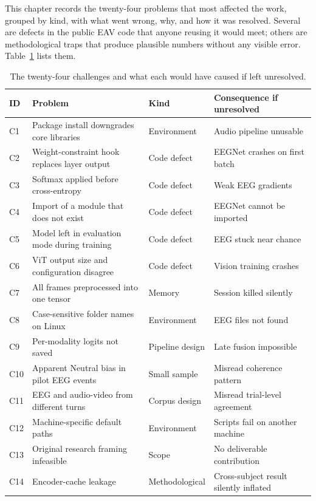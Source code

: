This chapter records the twenty-four problems that most affected the work, grouped by kind, with what went wrong, why, and how it was resolved. Several are defects in the public EAV code that anyone reusing it would meet; others are methodological traps that produce plausible numbers without any visible error. Table~\ref{tab:engineering_challenges} lists them.

\begin{table}[htbp]
\centering
\scriptsize
\caption{The twenty-four challenges and what each would have caused if left unresolved.}
\label{tab:engineering_challenges}
\begin{tabular}{p{1.0cm} p{4.7cm} p{3.2cm} p{4.2cm}}
\hline
\textbf{ID} & \textbf{Problem} & \textbf{Kind} & \textbf{Consequence if unresolved} \\
\hline
C1 & Package install downgrades core libraries & Environment & Audio pipeline unusable \\
C2 & Weight-constraint hook replaces layer output & Code defect & EEGNet crashes on first batch \\
C3 & Softmax applied before cross-entropy & Code defect & Weak EEG gradients \\
C4 & Import of a module that does not exist & Code defect & EEGNet cannot be imported \\
C5 & Model left in evaluation mode during training & Code defect & EEG stuck near chance \\
C6 & ViT output size and configuration disagree & Code defect & Vision training crashes \\
C7 & All frames preprocessed into one tensor & Memory & Session killed silently \\
C8 & Case-sensitive folder names on Linux & Environment & EEG files not found \\
C9 & Per-modality logits not saved & Pipeline design & Late fusion impossible \\
C10 & Apparent Neutral bias in pilot EEG events & Small sample & Misread coherence pattern \\
C11 & EEG and audio-video from different turns & Corpus design & Misread trial-level agreement \\
C12 & Machine-specific default paths & Environment & Scripts fail on another machine \\
C13 & Original research framing infeasible & Scope & No deliverable contribution \\
C14 & Encoder-cache leakage & Methodological & Cross-subject result silently inflated \\

\end{tabular}
\end{table}

